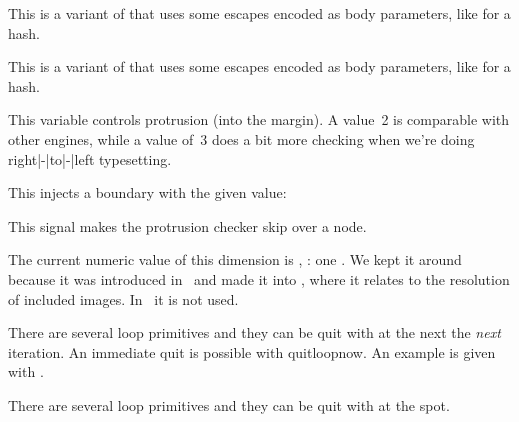 \startnewprimitive[title={\prm {protecteddetokenize}}]

This is a variant of  that uses some escapes encoded as
body parameters, like  for a hash.

\stopnewprimitive

\startnewprimitive[title={\prm {protectedexpandeddetokenize}}]

This is a variant of  that uses some escapes encoded as
body parameters, like  for a hash.

\stopnewprimitive

\startnewprimitive[title={\prm {protrudechars}}]

This variable controls protrusion (into the margin). A value~2 is comparable with
other engines, while a value of~3 does a bit more checking when we're doing
right|-|to|-|left typesetting.

\stopnewprimitive

\startnewprimitive[title={\prm {protrusionboundary}}]

This injects a boundary with the given value:


This signal makes the protrusion checker skip over a node.

\stopnewprimitive

\startnewprimitive[title={\prm {pxdimen}}]

The current numeric value of this dimension is \tointeger \pxdimen, \todimension
\pxdimen: one . We kept it around because it was introduced in \PDFTEX\
and made it into \LUATEX, where it relates to the resolution of included images.
In \CONTEXT\ it is not used.

\stopnewprimitive

\startnewprimitive[title={\prm {quitloop}}]

There are several loop primitives and they can be quit with  at
the next the {\em next} iteration. An immediate quit is possible with \prm
{quitloopnow}. An example is given with \prm {localcontrolledloop}.

\stopnewprimitive

\startnewprimitive[title={\prm {quitloopnow}}]

There are several loop primitives and they can be quit with 
at the spot.

\stopnewprimitive

